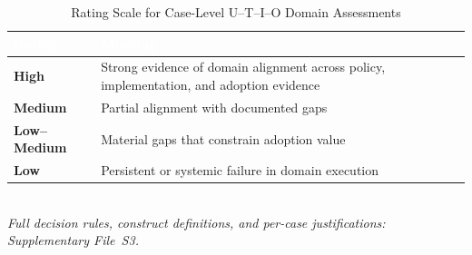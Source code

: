 \begin{table}[H]
\caption{Rating Scale for Case-Level U--T--I--O Domain Assessments}
\label{tab:rating-scale}
\centering
\small
\renewcommand{\arraystretch}{1.35}
\setlength{\tabcolsep}{8pt}
\begin{tabular}{p{2.6cm} p{11.0cm}}
\toprule
\rowcolor{headerblue}
\textcolor{white}{\textbf{Rating}} &
\textcolor{white}{\textbf{Meaning}} \\
\midrule
\rowcolor{rowgray}
\textbf{High} & Strong evidence of domain alignment across policy, implementation, and adoption evidence \\
\textbf{Medium} & Partial alignment with documented gaps \\
\rowcolor{rowgray}
\textbf{Low--Medium} & Material gaps that constrain adoption value \\
\textbf{Low} & Persistent or systemic failure in domain execution \\
\bottomrule
\end{tabular}
\vspace{4pt}\\
{\footnotesize \textit{Full decision rules, construct definitions, and per-case justifications: Supplementary File~S3.}}
\end{table}

